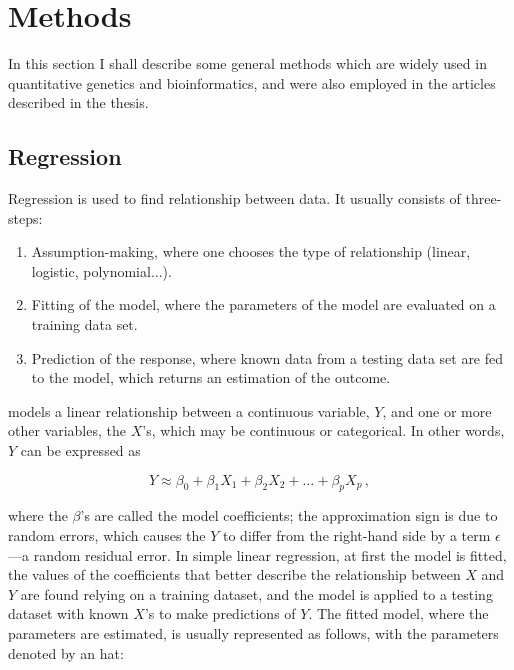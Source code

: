 \documentclass[../main.tex]{subfiles}
\begin{document}
\chapter{Methods}

In this section I shall describe some general methods which are widely 
used in quantitative genetics and bioinformatics, and were also employed 
in the articles described in the thesis.

\section{Regression}

Regression is used to find relationship between data. It usually 
consists of three-steps:

\begin{enumerate}
	\item Assumption-making, where one chooses the type of relationship 
(\eg linear, logistic, polynomial...).
	\item Fitting of the model, where the parameters of the model are 
evaluated on a training data set.
	\item Prediction of the response, where known data from a testing 
data set are fed to the model, which returns an estimation of the 
outcome.
\end{enumerate}

 models a linear 
relationship between a continuous variable, $Y$, and one or more other 
variables, the $X$'s, which may be continuous or categorical. In other 
words, $Y$ can be expressed as

\begin{equation}
	Y \approx \beta_0 + \beta_1X_1 + \beta_2X_2 + \ldots + \beta_pX_p\,,
\end{equation}

where the $\beta$'s are called the model coefficients; the approximation 
sign is due to random errors, which causes the $Y$ to differ from the 
right-hand side by a term $\epsilon$ ---a random residual error. In 
simple linear regression, at first the model is fitted, \ie the values 
of the coefficients that better describe the relationship between $X$ 
and $Y$ are found relying on a training dataset, and the model is 
applied to a testing dataset with known $X$'s to make predictions of 
$Y$. The fitted model, where the parameters are estimated, is usually 
represented as follows, with the parameters denoted by an hat:
\end{document}
